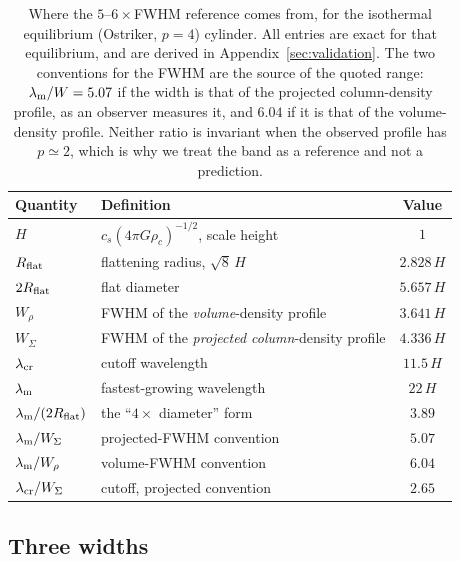 \documentclass[usenatbib,twoside,twocolumn]{mnras}
\begin{document}
\begin{table}
\caption{Where the $5$--$6\times$FWHM reference comes from, for the isothermal equilibrium (Ostriker, $p=4$) cylinder. All entries are exact for that equilibrium, and are derived in Appendix~\ref{sec:validation}. The two conventions for the FWHM are the source of the quoted range: $\lambda_{\rm m}/W=5.07$ if the width is that of the projected column-density profile, as an observer measures it, and $6.04$ if it is that of the volume-density profile. Neither ratio is invariant when the observed profile has $p\simeq2$, which is why we treat the band as a reference and not a prediction.}
\label{tab:benchmark}
\footnotesize
\setlength{\tabcolsep}{4pt}
\begin{tabular}{llc}
\toprule
Quantity & Definition & Value \\
\midrule
$H$ & $c_s(4\pi G\rho_c)^{-1/2}$, scale height & $1$ \\
$R_{\rm flat}$ & flattening radius, $\sqrt{8}\,H$ & $2.828\,H$ \\
$2R_{\rm flat}$ & flat diameter & $5.657\,H$ \\
$W_{\rho}$ & FWHM of the \emph{volume}-density profile & $3.641\,H$ \\
$W_{\Sigma}$ & FWHM of the \emph{projected column}-density profile & $4.336\,H$ \\
$\lambda_{\rm cr}$ & cutoff wavelength & $11.5\,H$ \\
$\lambda_{\rm m}$ & fastest-growing wavelength & $22\,H$ \\
\midrule
$\lambda_{\rm m}/(2R_{\rm flat})$ & the ``$4\times$ diameter'' form & $3.89$ \\
$\lambda_{\rm m}/W_{\Sigma}$ & projected-FWHM convention & $5.07$ \\
$\lambda_{\rm m}/W_{\rho}$ & volume-FWHM convention & $6.04$ \\
$\lambda_{\rm cr}/W_{\Sigma}$ & cutoff, projected convention & $2.65$ \\
\bottomrule
\end{tabular}
\end{table}


\subsection{Three widths}
\label{sec:width_correction}
\end{document}
